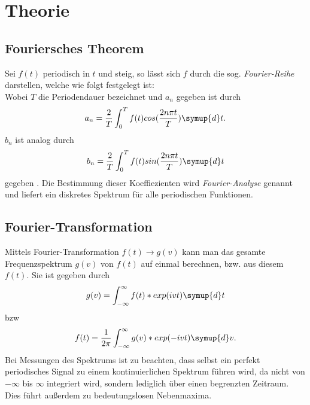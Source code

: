 \section{Theorie}
\label{sec:Theorie}

\subsection{Fouriersches Theorem}
\label{sec:Theorem}
Sei $f(t)$ periodisch in $t$ und steig, so lässt sich $f$ durch die sog. \textit{Fourier-Reihe} darstellen, welche wie folgt festgelegt ist:
\begin{equation}
  \label{eqn:Fourier-Reihe}
\end{equation}
Wobei $T$ die Periodendauer bezeichnet und $a_n$ gegeben ist durch
\begin{equation}
  a_n = \frac{2}{T} \int_0^T f(t) cos(\frac{2 n \pi t}{T}) \symup{d}t .
  \label{eqn:an}
\end{equation}
$b_n$ ist analog durch
\begin{equation}
  b_n = \frac{2}{T} \int_0^T f(t) sin(\frac{2 n \pi t}{T}) \symup{d}t
  \label{eqn:bn}
\end{equation}
gegeben \cite{sample}.
Die Bestimmung dieser Koeffiezienten wird \textit{Fourier-Analyse} genannt und liefert ein diskretes Spektrum für alle periodischen Funktionen.

\subsection{Fourier-Transformation}
\label{sec:Trafo}
Mittels Fourier-Transformation $f(t) \to g(v)$ kann man das gesamte Frequenzspektrum $g(v)$ von $f(t)$ auf einmal berechnen, bzw. aus diesem $f(t)$. Sie ist gegeben durch
\begin{equation}
  g(v) = \int_{-\infty}^{\infty} f(t)*exp(ivt) \symup{d}t
\end{equation}
bzw
\begin{equation}
  f(t) = \frac{1}{2\pi} \int_{-\infty}^{\infty} g(v)*exp(-ivt) \symup{d}v.
\end{equation}
Bei Messungen des Spektrums ist zu beachten, dass selbst ein perfekt periodisches Signal zu einem kontinuierlichen Spektrum führen wird, da nicht von $-\infty$ bis $\infty$ integriert wird, sondern lediglich über einen begrenzten Zeitraum. Dies führt außerdem zu bedeutungslosen Nebenmaxima.
